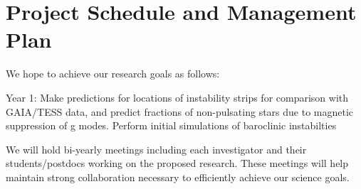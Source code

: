 \section{Project Schedule and Management Plan}

We hope to achieve our research goals as follows:

Year 1: Make predictions for locations of instability strips for comparison with GAIA/TESS data, and predict fractions of non-pulsating stars due to magnetic suppression of g modes. Perform initial simulations of baroclinic instabilties 

We will  hold bi-yearly meetings including each investigator and their students/postdocs working on the proposed research. These meetings will help maintain strong collaboration necessary to efficiently achieve our science goals.
